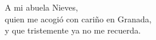 \thispagestyle{empty}
\clearpage\null\newpage
\thispagestyle{empty}
{}

\vspace*{3cm}

\begin{flushright}
    A mi abuela Nieves, \\
    quien me acogió con cariño en Granada, \\
    y que tristemente ya no me recuerda.
\end{flushright}
\newpage
\thispagestyle{empty}
\clearpage\null\newpage